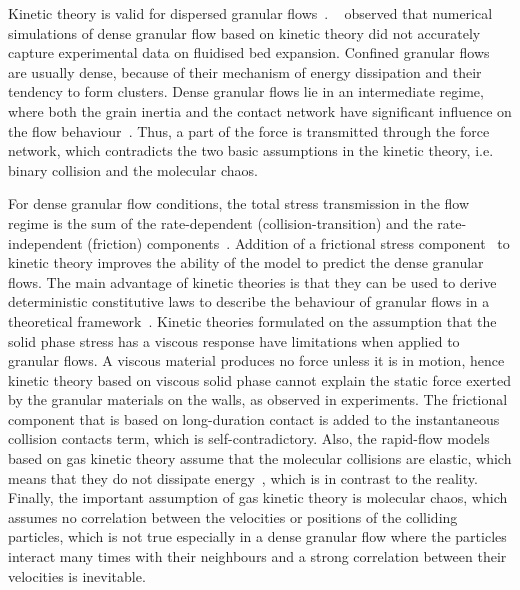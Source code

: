 Kinetic theory is valid for dispersed granular flows~\citep{Ng2008}.
~\citet{VanWachem2001} observed that numerical simulations of dense 
granular flow based on kinetic theory did not accurately capture
experimental data on fluidised bed expansion. Confined granular flows are 
usually dense, because of their mechanism of energy dissipation and their 
tendency to form clusters. Dense granular flows lie in an intermediate 
regime, where both the grain inertia and the contact network have significant 
influence on the flow behaviour~\citep{Pouliquen2002}. Thus, a part of the 
force is transmitted through the force network, which contradicts the two basic 
assumptions in the kinetic theory, i.e. binary collision and the molecular 
chaos. 

For dense granular flow conditions, the total stress transmission in the flow 
regime is the sum of the rate-dependent (collision-transition) and the 
rate-independent (friction) components~\citep{Ng2008}. Addition of a frictional 
stress component~\citep{Schaeffer1987} to kinetic theory improves the 
ability of the model to predict the dense granular flows. The main advantage of 
kinetic theories is that they can be used to derive deterministic constitutive 
laws to describe the behaviour of granular flows in a theoretical 
framework~\citep{Jenkins1983}. Kinetic theories formulated on the assumption 
that the solid phase stress has a viscous response have limitations when 
applied to granular flows. A viscous material produces no force unless it is in 
motion, hence kinetic theory based on viscous solid phase cannot explain the 
static force exerted by the granular materials on the walls, as observed in 
experiments. The frictional component that is based on long-duration contact is 
added to the instantaneous collision contacts term, which is 
self-contradictory. 
Also, the rapid-flow models based on gas 
kinetic theory assume that the molecular collisions are elastic, which means 
that they do not dissipate energy~\citep{Campbell2006}, which is in contrast to 
the reality. Finally, the important assumption of gas kinetic theory is 
molecular chaos, which assumes no correlation between the velocities or 
positions of the colliding particles, which is not true especially in a dense 
granular flow where the particles interact many times with their neighbours and 
a strong correlation between their velocities is inevitable.

